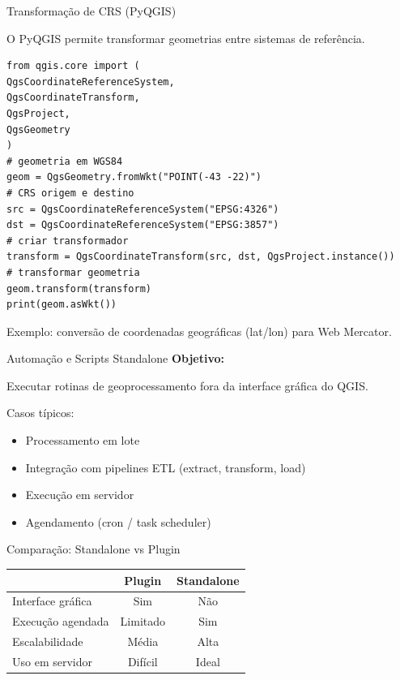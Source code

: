 \documentclass{beamer}
\begin{document}
\begin{frame}[fragile]{Transformação de CRS (PyQGIS)}
    
    O PyQGIS permite transformar geometrias entre sistemas de referência.
    
    \begin{verbatim}
from qgis.core import (
QgsCoordinateReferenceSystem,
QgsCoordinateTransform,
QgsProject,
QgsGeometry
)
# geometria em WGS84
geom = QgsGeometry.fromWkt("POINT(-43 -22)")
# CRS origem e destino
src = QgsCoordinateReferenceSystem("EPSG:4326")
dst = QgsCoordinateReferenceSystem("EPSG:3857")
# criar transformador
transform = QgsCoordinateTransform(src, dst, QgsProject.instance())
# transformar geometria
geom.transform(transform)
print(geom.asWkt())
    \end{verbatim}
    
    Exemplo: conversão de coordenadas geográficas (lat/lon) para Web Mercator.
    
\end{frame}



\begin{frame}{Automação e Scripts Standalone}
    \textbf{Objetivo:}
    
    Executar rotinas de geoprocessamento fora da interface gráfica do QGIS.
    
    \vspace{0.4cm}
    
    Casos típicos:
    \begin{itemize}
        \item Processamento em lote
        \item Integração com pipelines ETL (extract, transform, load)
        \item Execução em servidor
        \item Agendamento (cron / task scheduler)
    \end{itemize}
\end{frame}

\begin{frame}{Comparação: Standalone vs Plugin}
    \centering
    \begin{tabular}{l|c|c}
        & Plugin & Standalone \\
        \hline
        Interface gráfica & Sim & Não \\
        Execução agendada & Limitado & Sim \\
        Escalabilidade & Média & Alta \\
        Uso em servidor & Difícil & Ideal \\
    \end{tabular}
\end{frame}
\end{document}
